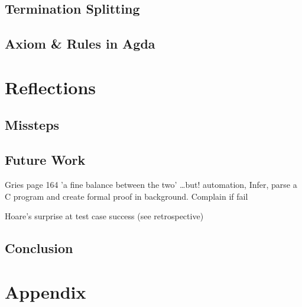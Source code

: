 \documentclass[oneside,12pt]{article}
\begin{document}
\subsection{Termination Splitting}

\subsection{Axiom \& Rules in Agda}

\section{Reflections}

\subsection{Missteps}

\subsection{Future Work}

Gries page 164 'a fine balance between the two' \ldots but! automation, Infer, parse a C program and create formal proof in background. Complain if fail

Hoare's surprise at test case success (see retrospective)

\subsection{Conclusion}


\section{Appendix}



\nocite{*}





  
\end{document}
